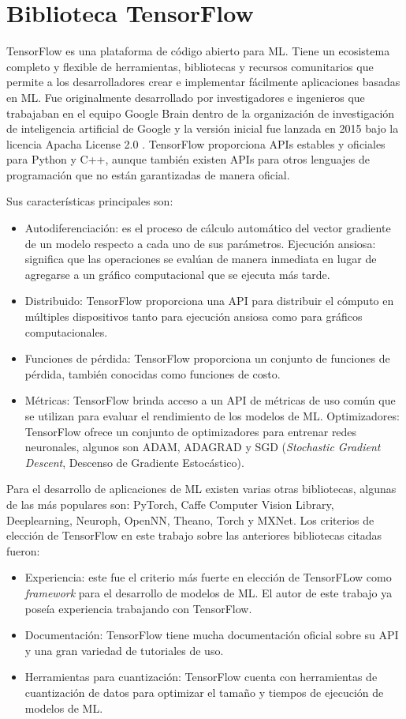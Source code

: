 \section{Biblioteca TensorFlow}
TensorFlow es una plataforma de código abierto para ML. Tiene un ecosistema completo y flexible de herramientas, bibliotecas y recursos comunitarios que permite a los desarrolladores crear e implementar fácilmente aplicaciones basadas en ML. Fue originalmente desarrollado por investigadores e ingenieros que trabajaban en el equipo Google Brain dentro de la organización de investigación de inteligencia artificial de Google y la versión inicial fue lanzada en 2015 bajo la licencia Apacha License 2.0 \cite{tf_info}. TensorFlow proporciona APIs estables y oficiales para Python y C++, aunque también existen APIs para otros lenguajes de programación que no están garantizadas de manera oficial.

Sus características principales son:
\begin{itemize}
	\item Autodiferenciación: es el proceso de cálculo automático del vector gradiente de un modelo respecto a cada uno de sus parámetros.
	Ejecución ansiosa: significa que las operaciones se evalúan de manera inmediata en lugar de agregarse a un gráfico computacional que se ejecuta más tarde.
	\item Distribuido: TensorFlow proporciona una API para distribuir el cómputo en múltiples dispositivos tanto para ejecución ansiosa como para gráficos computacionales.
	\item Funciones de pérdida: TensorFlow proporciona un conjunto de funciones de pérdida, también conocidas como funciones de costo.
	\item Métricas: TensorFlow brinda acceso a un API de métricas de uso común que se utilizan para evaluar el rendimiento de los modelos de ML.
	Optimizadores: TensorFlow ofrece un conjunto de optimizadores para entrenar redes neuronales, algunos son ADAM, ADAGRAD y SGD (\textit{Stochastic Gradient Descent}, Descenso de Gradiente Estocástico).
\end{itemize}

Para el desarrollo de aplicaciones de ML existen varias otras bibliotecas, algunas de las más populares son: PyTorch, Caffe Computer Vision Library, Deeplearning, Neuroph, OpenNN, Theano, Torch y MXNet. Los criterios de elección de TensorFlow en este trabajo sobre las anteriores bibliotecas citadas fueron:
\begin{itemize}
	\item Experiencia: este fue el criterio más fuerte en elección de TensorFLow como \textit{framework} para el desarrollo de modelos de ML. El autor de este trabajo ya poseía experiencia trabajando con TensorFlow.
	\item Documentación: TensorFlow tiene mucha documentación oficial sobre su API y una gran variedad de tutoriales de uso.
	\item Herramientas para cuantización: TensorFlow cuenta con herramientas de cuantización de datos para optimizar el tamaño y tiempos de ejecución de modelos de ML.
\end{itemize}

